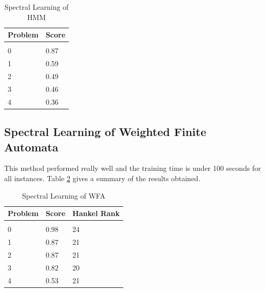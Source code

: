 \documentclass[letterpaper]{article}
\begin{document}
\begin{table}[h]
	\caption{Spectral Learning of HMM}
	\label{table:slhmm}
	\begin{center}
		\begin{tabular}{ll}
			\multicolumn{1}{c}{\bf Problem} & \multicolumn{1}{c}{\bf Score} \\
			\hline \\
			0                               & 0.87                          \\
			1                               & 0.59                          \\
			2                               & 0.49                          \\
			3                               & 0.46                          \\
			4                               & 0.36                          \\
		\end{tabular}
	\end{center}
\end{table}

\subsection{Spectral Learning of Weighted Finite Automata}
This method performed really well and the training time is under 100 seconds for all instances. Table \ref{table:slwfa} gives a summary of the results obtained.

\begin{table}[h]
	\caption{Spectral Learning of WFA}
	\label{table:slwfa}
	\begin{center}
		\begin{tabular}{lll}
			\multicolumn{1}{c}{\bf Problem} & \multicolumn{1}{c}{\bf Score} & \multicolumn{1}{c}{\bf Hankel Rank} \\
			\hline \\
			0                               & 0.98                          & 24                                  \\
			1                               & 0.87                          & 21                                  \\
			2                               & 0.87                          & 21                                  \\
			3                               & 0.82                          & 20                                  \\
			4                               & 0.53                          & 21                                  \\
		\end{tabular}
	\end{center}
\end{table}
\end{document}
